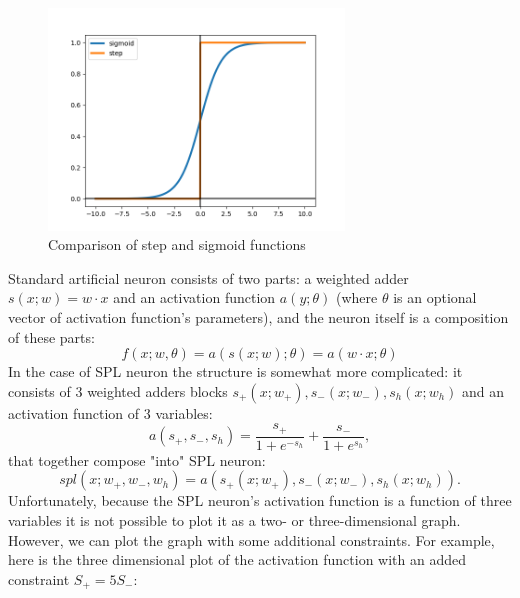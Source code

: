 \documentclass[sn-apa]{sn-jnl}%
\begin{document}
\begin{figure}[H]
\centering
\includegraphics[width=0.7\textwidth]{step_vs_sigmoid.png}
\caption{Comparison of step and sigmoid functions}\label{fig3}
\end{figure}

Standard artificial neuron consists of two parts: a weighted adder $s(x;w) = w \cdot x$ and an activation function $a(y; \theta)$ (where $\theta$ is an optional vector of activation function's parameters), and the neuron itself is a composition of these parts:
\begin{equation}
f(x;w,\theta)=a(s(x;w);\theta)=a(w \cdot x; \theta) \label{eq10}
\end{equation}
In the case of SPL neuron the structure is somewhat more complicated: it consists of 3 weighted adders blocks $s_+(x;w_+),s_-(x;w_-),s_h(x;w_h)$ and an activation function of 3 variables:
\begin{equation}
a(s_+,s_-,s_h) = \frac{s_+}{1 + e^{-s_h}} + \frac{s_-}{1 + e^{s_h}}, \label{eq11}
\end{equation}
that together compose "into" SPL neuron:
\begin{equation}
 spl(x;w_+,w_-,w_h) = a(s_+(x;w_+),s_-(x;w_-),s_h(x;w_h)). \label{eq12}
 \end{equation}
 Unfortunately, because the SPL neuron's activation function is a function of three variables it is not  possible to plot it as a two- or three-dimensional graph. However, we can plot the graph with some additional constraints. For example, here is the three dimensional plot of the activation function with an added constraint $S_+=5S_-$:
\end{document}
